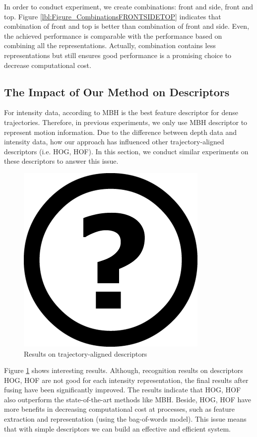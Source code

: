 \documentclass[review]{elsarticle}
\begin{document}
In order to conduct experiment, we create combinations: front and side, front and top. Figure \ref{lbl:Figure_CombinationsFRONTSIDETOP} indicates that combination of front and top is better than combination of front and side. Even, the achieved performance is comparable with the performance based on combining all the representations. Actually, combination contains less representations but still ensures good performance is a promising choice to decrease computational cost.

\subsection{The Impact of Our Method on Descriptors}

For intensity data, according to \cite{wang2011densetraj} MBH is the best feature descriptor for dense trajectories. Therefore, in previous experiments, we only use MBH descriptor to represent motion information. Due to the difference between depth data and intensity data, how our approach has influenced other trajectory-aligned descriptors (i.e. HOG, HOF). In this section, we conduct similar experiments on these descriptors to answer this issue.

\begin{figure}[H]
	\begin{center}
		\includegraphics[scale=0.5]{Unknown.png}
	\end{center}
	\caption{\label{lbl:Figure_MBHHOGHOF}Results on trajectory-aligned descriptors}
\end{figure}

Figure \ref{lbl:Figure_MBHHOGHOF} shows interesting results. Although, recognition results on descriptors HOG, HOF are not good for each intensity representation, the final results after fusing have been significantly improved. The results indicate that HOG, HOF also outperform the state-of-the-art methods like MBH. Beside, HOG, HOF have more benefits in decreasing computational cost at processes, such as feature extraction and representation (using the bag-of-words model). This issue means that with simple descriptors we can build an effective and efficient system.
\end{document}

